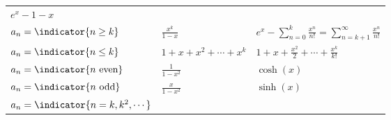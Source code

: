 \begin{longtable}[]{@{}lll@{}}
\begin{minipage}[t]{0.30\columnwidth}
\(e^x - 1 - x\)\strut
\end{minipage}\tabularnewline
\begin{minipage}[t]{0.30\columnwidth}\raggedright
\(a_n = \indicator{n \geq k}\)\strut
\end{minipage} & \begin{minipage}[t]{0.30\columnwidth}\raggedright
\(\frac {x^k} {1-x}\)\strut
\end{minipage} & \begin{minipage}[t]{0.30\columnwidth}\raggedright
\(e^x - \displaystyle\sum_{n=0}^k \frac{x^n}{n!} =\displaystyle\sum_{n=k+1}^\infty \frac{x^n}{n!}\)\strut
\end{minipage}\tabularnewline
\begin{minipage}[t]{0.30\columnwidth}\raggedright
\(a_n = \indicator{n \leq k}\)\strut
\end{minipage} & \begin{minipage}[t]{0.30\columnwidth}\raggedright
\(1+x+x^2+\cdots +x^k\)\strut
\end{minipage} & \begin{minipage}[t]{0.30\columnwidth}\raggedright
\(1 + x + \frac{x^2}{2} + \cdots +\frac{x^k}{k!}\)\strut
\end{minipage}\tabularnewline
\begin{minipage}[t]{0.30\columnwidth}\raggedright
\(a_n = \indicator{n\text{ even}}\)\strut
\end{minipage} & \begin{minipage}[t]{0.30\columnwidth}\raggedright
\(\frac{1}{1-x^2}\)\strut
\end{minipage} & \begin{minipage}[t]{0.30\columnwidth}\raggedright
\(\cosh(x)\)\strut
\end{minipage}\tabularnewline
\begin{minipage}[t]{0.30\columnwidth}\raggedright
\(a_n = \indicator{n\text{ odd}}\)\strut
\end{minipage} & \begin{minipage}[t]{0.30\columnwidth}\raggedright
\(\frac{x}{1-x^2}\)\strut
\end{minipage} & \begin{minipage}[t]{0.30\columnwidth}\raggedright
\(\sinh(x)\)\strut
\end{minipage}\tabularnewline
\begin{minipage}[t]{0.30\columnwidth}\raggedright
\(a_n = \indicator{n = k, k^2, \cdots}\)\strut
\end{minipage} & \begin{minipage}[t]{0.30\columnwidth}\raggedright

\end{minipage}
\end{longtable}
